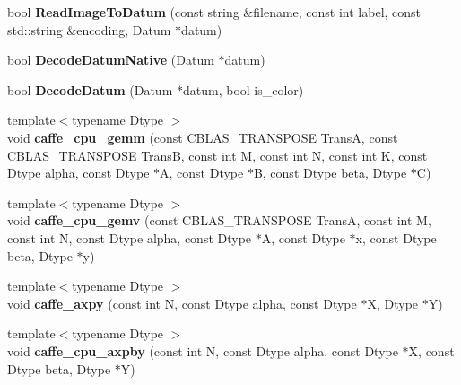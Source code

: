 \begin{DoxyCompactItemize}
\item 
bool {\bfseries Read\+Image\+To\+Datum} (const string \&filename, const int label, const std\+::string \&encoding, Datum $\ast$datum)\hypertarget{namespacecaffe_afa7c4ea7b54a9778a8ee0885e094176b}{}\label{namespacecaffe_afa7c4ea7b54a9778a8ee0885e094176b}

\item 
bool {\bfseries Decode\+Datum\+Native} (Datum $\ast$datum)\hypertarget{namespacecaffe_a8c85e2fea3e8b4f7cdcb9b668747bc44}{}\label{namespacecaffe_a8c85e2fea3e8b4f7cdcb9b668747bc44}

\item 
bool {\bfseries Decode\+Datum} (Datum $\ast$datum, bool is\+\_\+color)\hypertarget{namespacecaffe_a6335d16a871bb3f679699b19f3a61faf}{}\label{namespacecaffe_a6335d16a871bb3f679699b19f3a61faf}

\item 
{\footnotesize template$<$typename Dtype $>$ }\\void {\bfseries caffe\+\_\+cpu\+\_\+gemm} (const C\+B\+L\+A\+S\+\_\+\+T\+R\+A\+N\+S\+P\+O\+SE TransA, const C\+B\+L\+A\+S\+\_\+\+T\+R\+A\+N\+S\+P\+O\+SE TransB, const int M, const int N, const int K, const Dtype alpha, const Dtype $\ast$A, const Dtype $\ast$B, const Dtype beta, Dtype $\ast$C)\hypertarget{namespacecaffe_aa92272cd2715dcb6bf21cdcec8237434}{}\label{namespacecaffe_aa92272cd2715dcb6bf21cdcec8237434}

\item 
{\footnotesize template$<$typename Dtype $>$ }\\void {\bfseries caffe\+\_\+cpu\+\_\+gemv} (const C\+B\+L\+A\+S\+\_\+\+T\+R\+A\+N\+S\+P\+O\+SE TransA, const int M, const int N, const Dtype alpha, const Dtype $\ast$A, const Dtype $\ast$x, const Dtype beta, Dtype $\ast$y)\hypertarget{namespacecaffe_a62891c5bf1e1f05222a6b9a2a574c146}{}\label{namespacecaffe_a62891c5bf1e1f05222a6b9a2a574c146}

\item 
{\footnotesize template$<$typename Dtype $>$ }\\void {\bfseries caffe\+\_\+axpy} (const int N, const Dtype alpha, const Dtype $\ast$X, Dtype $\ast$Y)\hypertarget{namespacecaffe_a6f63c879651c583e5404223e29634a04}{}\label{namespacecaffe_a6f63c879651c583e5404223e29634a04}

\item 
{\footnotesize template$<$typename Dtype $>$ }\\void {\bfseries caffe\+\_\+cpu\+\_\+axpby} (const int N, const Dtype alpha, const Dtype $\ast$X, const Dtype beta, Dtype $\ast$Y)\hypertarget{namespacecaffe_af05e0b9cc43bfe82150f6fad870b2e07}{}\label{namespacecaffe_af05e0b9cc43bfe82150f6fad870b2e07}


\end{DoxyCompactItemize}
